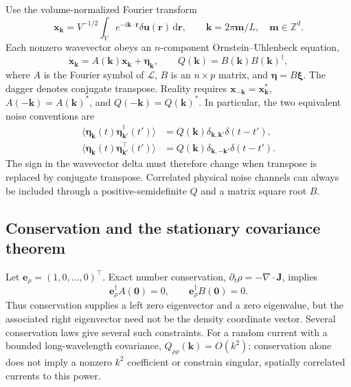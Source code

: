 \documentclass{article}
\begin{document}
Use the volume-normalized Fourier transform
\begin{equation}
    \mathbf x_{\mathbf k}=V^{-1/2}\int_V e^{-\mathrm i\mathbf k\cdot\mathbf r}
    \delta\mathbf u(\mathbf r)\,\mathrm d\mathbf r,
    \qquad \mathbf k=2\pi\mathbf m/L,\quad \mathbf m\in\mathbb Z^d.
\end{equation}
Each nonzero wavevector obeys an $n$-component Ornstein--Uhlenbeck equation,
\begin{equation}
    \boxed{\dot{\mathbf x}_{\mathbf k}=A(\mathbf k)\mathbf x_{\mathbf k}
    +\boldsymbol\eta_{\mathbf k},\qquad Q(\mathbf k)=B(\mathbf k)B(\mathbf k)^\dagger,}
    \label{eq:gfOU}
\end{equation}
where $A$ is the Fourier symbol of $\mathcal L$, $B$ is an $n\times p$ matrix, and $\boldsymbol\eta=B\boldsymbol\xi$. The dagger denotes conjugate transpose. Reality requires $\mathbf x_{-\mathbf k}=\mathbf x_{\mathbf k}^*$, $A(-\mathbf k)=A(\mathbf k)^*$, and $Q(-\mathbf k)=Q(\mathbf k)^*$. In particular, the two equivalent noise conventions are
\begin{align}
    \langle\boldsymbol\eta_{\mathbf k}(t)\boldsymbol\eta_{\mathbf k'}^\dagger(t')\rangle
    &=Q(\mathbf k)\delta_{\mathbf k,\mathbf k'}\delta(t-t'),\\
    \langle\boldsymbol\eta_{\mathbf k}(t)\boldsymbol\eta_{\mathbf k'}^{\top}(t')\rangle
    &=Q(\mathbf k)\delta_{\mathbf k,-\mathbf k'}\delta(t-t').
    \label{eq:gfNoise}
\end{align}
The sign in the wavevector delta must therefore change when transpose is replaced by conjugate transpose. Correlated physical noise channels can always be included through a positive-semidefinite $Q$ and a matrix square root $B$.

\subsection{Conservation and the stationary covariance theorem}

Let $\mathbf e_\rho=(1,0,\ldots,0)^{\top}$. Exact number conservation, $\partial_t\rho=-\nabla\cdot\mathbf J$, implies
\begin{equation}
    \mathbf e_\rho^\dagger A(\mathbf0)=0,
    \qquad \mathbf e_\rho^\dagger B(\mathbf0)=0.
    \label{eq:gfConservation}
\end{equation}
Thus conservation supplies a left zero eigenvector and a zero eigenvalue, but the associated right eigenvector need not be the density coordinate vector. Several conservation laws give several such constraints. For a random current with a bounded long-wavelength covariance, $Q_{\rho\rho}(\mathbf k)=O(k^2)$; conservation alone does not imply a nonzero $k^2$ coefficient or constrain singular, spatially correlated currents to this power.
\end{document}
